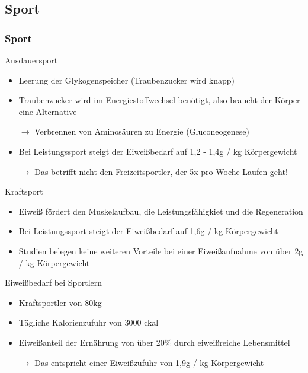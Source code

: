 \documentclass[xcolor=dvipsnames]{beamer}
\begin{document}
    \subsection{Sport}
    \begin{frame}[allowframebreaks]
        \frametitle{Sport}

        \begin{block}{Ausdauersport}
            \begin{itemize}
                \setlength\itemsep{1em}
                \item Leerung der Glykogenspeicher (Traubenzucker wird knapp)
                \item Traubenzucker wird im Energiestoffwechsel benötigt, also braucht der Körper eine Alternative
                \item[$\rightarrow$] Verbrennen von Aminosäuren zu Energie (Gluconeogenese)
                \item Bei Leistungssport steigt der Eiweißbedarf auf 1,2 - 1,4g / kg Körpergewicht
                \item[$\rightarrow$] Das betrifft nicht den Freizeitsportler, der 5x pro Woche Laufen geht!
            \end{itemize}
        \end{block}

        \framebreak

        \begin{block}{Kraftsport}
            \begin{itemize}
                \setlength\itemsep{1em}
                \item Eiweiß fördert den Muskelaufbau, die Leistungsfähigkiet und die Regeneration
                \item Bei Leistungssport steigt der Eiweißbedarf auf 1,6g / kg Körpergewicht
                \item Studien belegen keine weiteren Vorteile bei einer Eiweißaufnahme von über 2g / kg Körpergewicht
            \end{itemize}
        \end{block}

        \framebreak

        \begin{block}{Eiweißbedarf bei Sportlern}
            \begin{itemize}
                \setlength\itemsep{1em}
                \item Kraftsportler von 80kg
                \item Tägliche Kalorienzufuhr von 3000 ckal
                \item Eiweißanteil der Ernährung von über 20\% durch eiweißreiche Lebensmittel
                \item[$\rightarrow$] Das entspricht einer Eiweißzufuhr von 1,9g / kg Körpergewicht
            \end{itemize}
        \end{block}


\end{frame}
\end{document}
